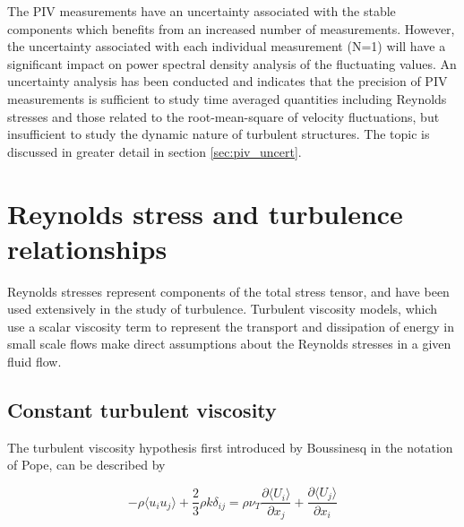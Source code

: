 The PIV measurements have an uncertainty associated with the stable components 
which benefits from an increased number of measurements. However, the 
uncertainty associated with each individual measurement (N=1) will have a 
significant impact on power spectral density analysis of the fluctuating 
values. An uncertainty analysis has been conducted and indicates that the 
precision of PIV measurements is sufficient to study time averaged quantities 
including Reynolds stresses and those related to the root-mean-square of 
velocity fluctuations, but insufficient to study the dynamic nature of 
turbulent structures. The topic is discussed in greater detail in section 
\ref{sec:piv_uncert}.

\section{Reynolds stress and turbulence relationships}

Reynolds stresses represent components of the total stress tensor, and have 
been used extensively in the study of turbulence. Turbulent viscosity models, 
which use a scalar viscosity term to represent the transport and dissipation of 
energy in small scale flows make direct assumptions about the Reynolds stresses 
in a given fluid flow. 

\subsection{Constant turbulent viscosity}
The turbulent viscosity hypothesis first introduced by 
Boussinesq \cite{pope2000} in the notation of Pope, can be described by

\begin{equation}
-\rho \langle u_i u_j \rangle + \frac{2}{3}\rho k \delta_{ij} = \rho \nu_T
\frac{\partial \langle U_i \rangle}{\partial x_j} + \frac{\partial \langle U_j 
\rangle}{\partial x_i}
\end{equation} 

